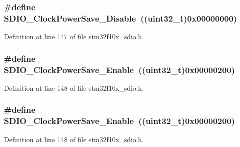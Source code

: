 \subsubsection[{\texorpdfstring{S\+D\+I\+O\+\_\+\+Clock\+Power\+Save\+\_\+\+Disable}{SDIO_ClockPowerSave_Disable}}]{\setlength{\rightskip}{0pt plus 5cm}\#define S\+D\+I\+O\+\_\+\+Clock\+Power\+Save\+\_\+\+Disable~(({\bf uint32\+\_\+t})0x00000000)}\hypertarget{group___s_d_i_o___clock___power___save_ga032aa5fb2dfd7ba5dbd60a3845c82ba0}{}\label{group___s_d_i_o___clock___power___save_ga032aa5fb2dfd7ba5dbd60a3845c82ba0}


Definition at line 147 of file stm32f10x\+\_\+sdio.\+h.

\subsubsection[{\texorpdfstring{S\+D\+I\+O\+\_\+\+Clock\+Power\+Save\+\_\+\+Enable}{SDIO_ClockPowerSave_Enable}}]{\setlength{\rightskip}{0pt plus 5cm}\#define S\+D\+I\+O\+\_\+\+Clock\+Power\+Save\+\_\+\+Enable~(({\bf uint32\+\_\+t})0x00000200)}\hypertarget{group___s_d_i_o___clock___power___save_ga9f5b66a0044c4ff36a3eb1ec758f7ea7}{}\label{group___s_d_i_o___clock___power___save_ga9f5b66a0044c4ff36a3eb1ec758f7ea7}


Definition at line 148 of file stm32f10x\+\_\+sdio.\+h.

\subsubsection[{\texorpdfstring{S\+D\+I\+O\+\_\+\+Clock\+Power\+Save\+\_\+\+Enable}{SDIO_ClockPowerSave_Enable}}]{\setlength{\rightskip}{0pt plus 5cm}\#define S\+D\+I\+O\+\_\+\+Clock\+Power\+Save\+\_\+\+Enable~(({\bf uint32\+\_\+t})0x00000200)}\hypertarget{group___s_d_i_o___clock___power___save_ga9f5b66a0044c4ff36a3eb1ec758f7ea7}{}\label{group___s_d_i_o___clock___power___save_ga9f5b66a0044c4ff36a3eb1ec758f7ea7}


Definition at line 148 of file stm32f10x\+\_\+sdio.\+h.

